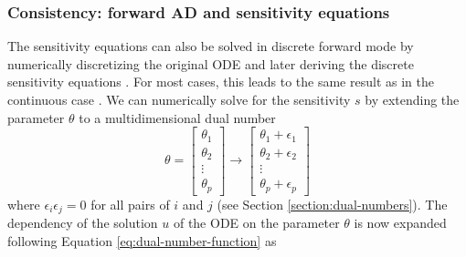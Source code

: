 
\subsubsection{Consistency: forward AD and sensitivity equations}
\label{section:forwardAD-sensitivity}

The sensitivity equations can also be solved in discrete forward mode by numerically discretizing the original ODE and later deriving the discrete sensitivity equations \cite{ma2021comparison}. 
For most cases, this leads to the same result as in the continuous case \cite{FATODE2014}.
We can numerically solve for the sensitivity $s$ by extending the parameter $\theta$ to a multidimensional dual number %
\begin{equation}
    \theta =
    \begin{bmatrix}
    \theta_1 \\
    \theta_2 \\
    \vdots \\
    \theta_p
    \end{bmatrix}
    \longrightarrow
    \begin{bmatrix}
    \theta_1 + \epsilon_1 \\
    \theta_2 + \epsilon_2 \\
    \vdots \\
    \theta_p + \epsilon_p
    \end{bmatrix}
\end{equation}
where $\epsilon_i \epsilon_j = 0$ for all pairs of $i$ and $j$ (see Section \ref{section:dual-numbers}). 
The dependency of the solution $u$ of the ODE on the parameter $\theta$ is now expanded following Equation \eqref{eq:dual-number-function} as 
